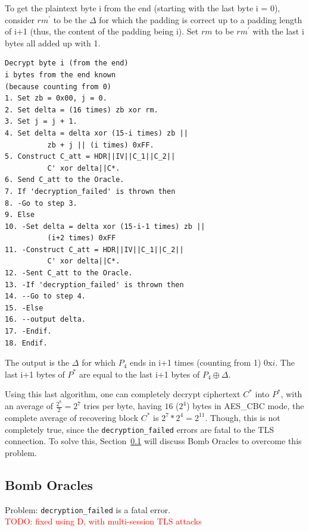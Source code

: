 \documentclass[10pt,conference,a4paper]{IEEEtran}
\begin{document}
To get the plaintext byte i from the end (starting with the last byte i = 0), consider $rm^{'}$ to be the $\Delta$ for which the padding is correct up to a padding length of i+1 (thus, the content of the padding being i). Set $rm$ to be $rm^{'}$ with the last i bytes all added up with 1.
\begin{verbatim}
Decrypt byte i (from the end)
i bytes from the end known
(because counting from 0)
1. Set zb = 0x00, j = 0.
2. Set delta = (16 times) zb xor rm.
3. Set j = j + 1.
4. Set delta = delta xor (15-i times) zb ||
          zb + j || (i times) 0xFF.
5. Construct C_att = HDR||IV||C_1||C_2||
          C' xor delta||C*.
6. Send C_att to the Oracle.
7. If 'decryption_failed' is thrown then
8. -Go to step 3.
9. Else
10. -Set delta = delta xor (15-i-1 times) zb ||
          (i+2 times) 0xFF
11. -Construct C_att = HDR||IV||C_1||C_2||
          C' xor delta||C*.
12. -Sent C_att to the Oracle.
13. -If 'decryption_failed' is thrown then
14. --Go to step 4.
15. -Else
16. --output delta.
17. -Endif.
18. Endif.
\end{verbatim}
The output is the $\Delta$ for which $P_4$ ends in i+1 times (counting from 1) $0\text{x}i$. The last i+1 bytes of $P^{*}$ are equal to the last i+1 bytes of $P_4 \oplus \Delta$.

Using this last algorithm, one can completely decrypt ciphertext $C^{*}$ into $P^{*}$, with an average of $\frac{2^8}{2} = 2^7$ tries per byte, having $16$ ($2^4$) bytes in AES\_CBC mode, the complete average of recovering block $C^{*}$ is $2^7 * 2^4 = 2^{11}$. Though, this is not completely true, since the \texttt{decryption\_failed} errors are fatal to the TLS connection. To solve this, Section~\ref{sec:paddingoracle:bomb} will discuss Bomb Oracles to overcome this problem.

\subsection{Bomb Oracles}
\label{sec:paddingoracle:bomb}
Problem: \texttt{decryption\_failed} is a fatal error. \\
\textcolor{red}{TODO: fixed using D, with multi-session TLS attacks}
\end{document}
